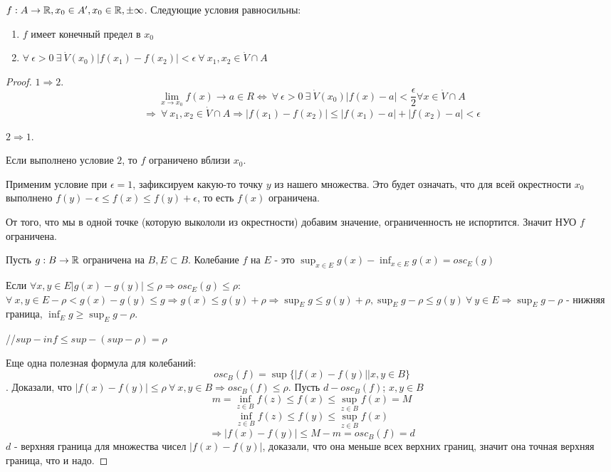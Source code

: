 \documentclass[12pt]{report}
\begin{document}
\begin{thm}
$f: A \to \mathbb{R}, x_0 \in A', x_0 \in \mathbb{R}, \pm\infty$. Следующие условия равносильны:
\begin{enumerate}
\item $f$ имеет конечный предел в $x_0$
\item $\forall ~\epsilon > 0 ~\exists ~\dot V(x_0) |f(x_1) - f(x_2)| < \epsilon ~\forall ~x_1, x_2 \in \dot V \cap A$
\end{enumerate}
\end{thm}
\begin{proof}
$1 \Rightarrow 2$. $$\lim_{x \to x_0}{f(x)} \to a \in R \Leftrightarrow ~\forall ~\epsilon > 0 ~\exists ~\dot V(x_0) |f(x) - a | < \frac{\epsilon}{2} \forall x \in \dot V \cap A$$
$$\Rightarrow ~\forall ~x_1, x_2 \in \dot V \cap A \Rightarrow |f(x_1) - f(x_2)| \le |f(x_1) - a| + |f(x_2) - a| < \epsilon$$

$2 \Rightarrow 1$. 
\begin{lm}
Если выполнено условие $2$, то $f$ ограничено вблизи $x_0$. 
\end{lm}
Применим условие при $\epsilon = 1$, зафиксируем какую-то точку $y$ из нашего множества. Это будет означать, что для всей окрестности $x_0$ выполнено $f(y) - \epsilon \le f(x) \le f(y) + \epsilon$, то есть $f(x)$ ограничена.

От того, что мы в одной точке (которую выкололи из окрестности) добавим значение, ограниченность не испортится. Значит НУО $f$ ограничена.

\begin{defn}
Пусть $g: B \to \mathbb{R}$ ограничена на $B, E \subset B$. Колебание $f$ на $E$ - это $\sup_{x \in E}{g(x)} - \inf_{x \in E}{g(x)} = osc_E(g)$
\end{defn} 
Если $\forall x, y \in E |g(x) - g(y)| \le \rho \Rightarrow osc_E(g) \le \rho$:
$\forall ~x, y \in E -\rho < g(x) - g(y) \le g \Rightarrow g(x) \le g(y) + \rho \Rightarrow \sup_E{g} \le g(y) + \rho, \sup_E{g} - \rho \le g(y) ~\forall ~y \in E \Rightarrow \sup_E{g} - \rho$ - нижняя граница, $\inf_E{g} \ge \sup_E{g} - \rho$.

//$sup - inf \le sup - (sup - \rho) = \rho$

Еще одна полезная формула для колебаний: $$osc_B(f) = \sup{\{|f(x) - f(y)| | x, y \in B\}}$$.
Доказали, что $|f(x) - f(y)| \le \rho ~\forall ~x, y \in B \Rightarrow osc_B(f) \le \rho$. Пусть $d - osc_B(f)$; $x, y \in B$
$$m = \inf_{z \in B}{f(z)} \le f(x) \le \sup_{z \in B}{f(x)} = M$$
$$\inf_{z \in B}{f(z)} \le f(y) \le \sup_{z \in B}{f(x)}$$
$$\Rightarrow |f(x) - f(y)| \le M - m = osc_B(f) = d$$
$d$ - верхняя граница для множества чисел $|f(x) - f(y)|$, доказали, что она меньше всех верхних границ, значит она точная верхняя граница, что и надо.


\end{proof}
\end{document}
